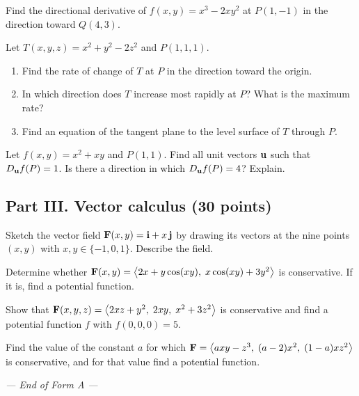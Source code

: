 \begin{questions}[resume]
\item Find the directional derivative of $f(x,y)=x^3-2xy^2$ at $P(1,-1)$ in the
      direction toward $Q(4,3)$. 
\item Let $T(x,y,z)=x^2+y^2-2z^2$ and $P(1,1,1)$.
      \begin{enumerate}[label=(\alph*)]
        \item Find the rate of change of $T$ at $P$ in the direction toward the origin.
        \item In which direction does $T$ increase most rapidly at $P$? What is the maximum rate?
        \item Find an equation of the tangent plane to the level surface of $T$ through $P$.
      \end{enumerate}
\item Let $f(x,y)=x^2+xy$ and $P(1,1)$. Find all unit vectors $\mathbf{u}$ such that
      $D_{\mathbf{u}} f(P)=1$. Is there a direction in which $D_{\mathbf{u}} f(P)=4$? Explain. 
\end{questions}

\subsection*{Part III. Vector calculus (30 points)}

\begin{questions}[resume]
\item Sketch the vector field $\mathbf{F}(x,y)=\mathbf{i}+x\,\mathbf{j}$ by drawing its vectors at
      the nine points $(x,y)$ with $x,y\in\{-1,0,1\}$. Describe the field. 
\item Determine whether $\mathbf{F}(x,y)=\left\langle 2x+y\cos(xy),\;x\cos(xy)+3y^2 \right\rangle$ is
      conservative. If it is, find a potential function. 
\item Show that $\mathbf{F}(x,y,z)=\left\langle 2xz+y^2,\;2xy,\;x^2+3z^2 \right\rangle$ is conservative and find
      a potential function $f$ with $f(0,0,0)=5$. 
\item Find the value of the constant $a$ for which
      $\mathbf{F}=\left\langle axy-z^3,\;(a-2)x^2,\;(1-a)xz^2 \right\rangle$ is conservative, and for that value
      find a potential function. 
\end{questions}

\begin{center}\textit{--- End of Form A ---}\end{center}
